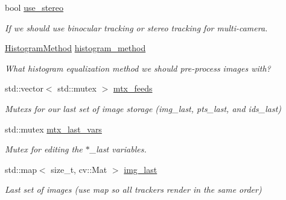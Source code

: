 \begin{DoxyCompactItemize}
\mbox{\label{classov__core_1_1TrackBase_a33375ebbd4b3ebcd69c782e897847276}} 
bool \hyperlink{classov__core_1_1TrackBase_a33375ebbd4b3ebcd69c782e897847276}{use\+\_\+stereo}
\begin{DoxyCompactList}\small\item\em If we should use binocular tracking or stereo tracking for multi-\/camera. \end{DoxyCompactList}\item 
\mbox{\label{classov__core_1_1TrackBase_adbd2200d5a77254ee57e5a86f9e367c6}} 
\hyperlink{classov__core_1_1TrackBase_aa4b34a5dce99b59522d57bf9278c9a1a}{Histogram\+Method} \hyperlink{classov__core_1_1TrackBase_adbd2200d5a77254ee57e5a86f9e367c6}{histogram\+\_\+method}
\begin{DoxyCompactList}\small\item\em What histogram equalization method we should pre-\/process images with? \end{DoxyCompactList}\item 
\mbox{\label{classov__core_1_1TrackBase_a8d9a970b148abdee71e1ace835c38c7c}} 
std\+::vector$<$ std\+::mutex $>$ \hyperlink{classov__core_1_1TrackBase_a8d9a970b148abdee71e1ace835c38c7c}{mtx\+\_\+feeds}
\begin{DoxyCompactList}\small\item\em Mutexs for our last set of image storage (img\+\_\+last, pts\+\_\+last, and ids\+\_\+last) \end{DoxyCompactList}\item 
\mbox{\label{classov__core_1_1TrackBase_afc70de91df5ec14f4db66414a71f0fbb}} 
std\+::mutex \hyperlink{classov__core_1_1TrackBase_afc70de91df5ec14f4db66414a71f0fbb}{mtx\+\_\+last\+\_\+vars}
\begin{DoxyCompactList}\small\item\em Mutex for editing the $\ast$\+\_\+last variables. \end{DoxyCompactList}\item 
\mbox{\label{classov__core_1_1TrackBase_a84396d08375c2c796fc759de12d28469}} 
std\+::map$<$ size\+\_\+t, cv\+::\+Mat $>$ \hyperlink{classov__core_1_1TrackBase_a84396d08375c2c796fc759de12d28469}{img\+\_\+last}
\begin{DoxyCompactList}\small\item\em Last set of images (use map so all trackers render in the same order) \end{DoxyCompactList}\item 

\end{DoxyCompactItemize}
